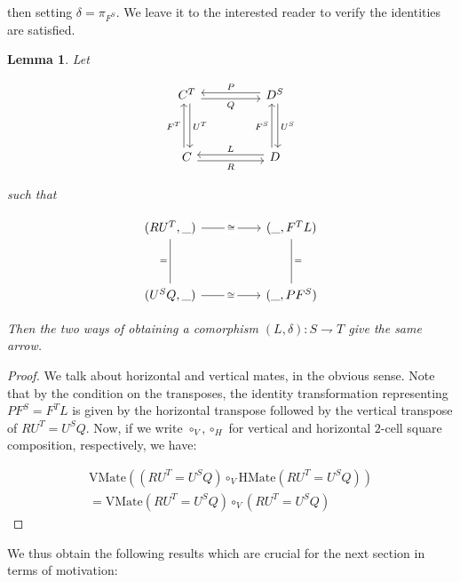 \documentclass[10pt, oneside]{article}
\newtheorem{lemma}[theorem]{Lemma}
\begin{document}
\noindent then setting $\delta = \pi_{F^S}$. We leave it to the interested reader to verify the identities are satisfied.

\begin{lemma}
    Let

    \[\begin{tikzcd}[ampersand replacement=\&]
	{C^T} \&\& {D^S} \\
	\\
	C \&\& D
	\arrow["Q"', shift right, from=1-1, to=1-3]
	\arrow["R"', shift right, from=3-1, to=3-3]
	\arrow["{U^T}", shift left, from=1-1, to=3-1]
	\arrow["{U^S}", shift left, from=1-3, to=3-3]
	\arrow["{F^T}", shift left, from=3-1, to=1-1]
	\arrow["{F^S}", shift left, from=3-3, to=1-3]
	\arrow["P"', shift right, from=1-3, to=1-1]
	\arrow["L"', shift right, from=3-3, to=3-1]
\end{tikzcd}\]

\noindent such that

\[\begin{tikzcd}[ampersand replacement=\&]
	{(R U^T, \_)} \&\& {(\_, F^T L)} \\
	\\
	{(U^S Q, \_)} \&\& {(\_, P F^S)}
	\arrow["{=}"', no head, from=1-1, to=3-1]
	\arrow["{=}", no head, from=1-3, to=3-3]
	\arrow["\cong"{description}, from=3-1, to=3-3]
	\arrow["\cong"{description}, from=1-1, to=1-3]
\end{tikzcd}\]

Then the two ways of obtaining a comorphism $(L, \delta): S \rightharpoondown T$ give the same arrow.
\end{lemma}
\begin{proof}

We talk about horizontal and vertical mates, in the obvious sense. Note that by the condition on the transposes, the identity transformation representing $P F^S = F^T L$ is given by the horizontal transpose followed by the vertical transpose of $R U^T = U^S Q$. Now, if we write $\circ_V, \circ_H$ for vertical and horizontal $2$-cell square composition, respectively, we have:

\begin{align*}
\mathrm{VMate}( (R U^T = U^S Q) \circ_V  \mathrm{HMate}(R U^T = U^S Q))
\\ = \mathrm{VMate}(R U^T = U^S Q) \circ_V (R U^T = U^S Q)
\end{align*}
    
\end{proof}

We thus obtain the following results which are crucial for the next section in terms of motivation:
\end{document}
